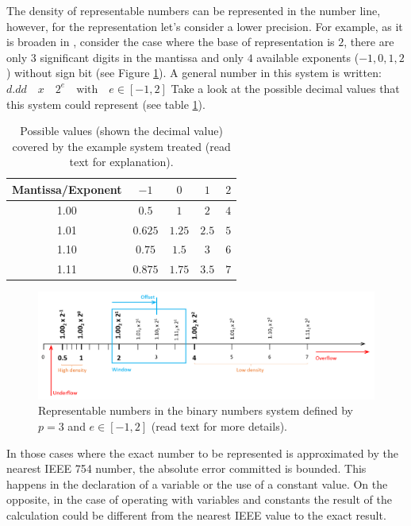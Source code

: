 The density of representable numbers can be represented in the number line, however, for the representation let's consider a lower precision. 
For example, as it is broaden in \cite{articleIEEE}, consider the case where the base of representation is $2$, there are only $3$ 
significant digits in the mantissa and only $4$ available exponents ($-1, 0, 1, 2$) without sign bit (see Figure \ref{fig:DensityNumbers}). A 
general number in this system is written: $d.dd \quad x \quad 2^{e}\quad \textrm{with}\quad e \in \left[-1, 2\right] $ Take a look at the 
possible decimal values that this system could represent (see table \ref{tab:PossibleValues}).

\begin{table}
    \centering
    \begin{tabular}{| c | c | c | c | c | }
        \hline
        Mantissa/Exponent   & $-1$ & $0$  & $1$  &   $2$  \\ \hline
        1.00                & $0.5$ & $1$  & $2$  &   $4$  \\ \hline
        1.01                & $0.625$ & $1.25$  & $2.5$  &   $5$  \\ \hline
        1.10                & $0.75$ & $1.5$  & $3$  &   $6$  \\ \hline
        1.11                & $0.875$ & $1.75$  & $3.5$  &   $7$  \\ \hline
    \end{tabular}
    \caption{Possible values (shown the decimal value) covered by the example system treated (read text for explanation).}
    \label{tab:PossibleValues}
\end{table}

\begin{figure}[h]
    \centering
    \includegraphics[width= \textwidth]{./doc/Figures/DensityNumbers.png}
    \caption{Representable numbers in the binary numbers system defined by $p = 3$ and $e\in\left[-1, 2  \right]$ (read text for more 
    details).}
    \label{fig:DensityNumbers}
\end{figure}


In those cases where the exact number to be represented is approximated by the nearest IEEE 754 number, the absolute error committed is 
bounded. This happens in the declaration of a variable or the use of a constant value. On the opposite, in the case of operating with 
variables and constants the result of the calculation could be different from the nearest IEEE value to the exact result. 

